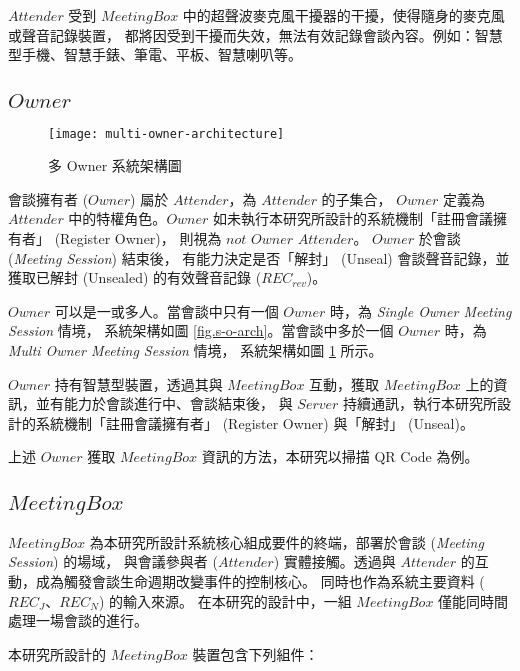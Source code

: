     $Attender$ 受到 $MeetingBox$ 中的超聲波麥克風干擾器的干擾，使得隨身的麥克風或聲音記錄裝置，
都將因受到干擾而失效，無法有效記錄會談內容。例如：智慧型手機、智慧手錶、筆電、平板、智慧喇叭等。


\subsection{$Owner$}

\begin{figure}[H]
    \centering
    \texttt{[image: multi-owner-architecture]}
    \caption{多 Owner 系統架構圖}
    \label{fig.m-o-arch}
\end{figure}

    會談擁有者 ($Owner$) 屬於 $Attender$，為 $Attender$ 的子集合，
$Owner$ 定義為 $Attender$ 中的特權角色。$Owner$ 如未執行本研究所設計的系統機制「註冊會議擁有者」 (Register Owner)，
則視為 $not$ $Owner$ $Attender$。 $Owner$ 於會談 ({\it Meeting Session}) 結束後，
有能力決定是否「解封」 (Unseal) 會談聲音記錄，並獲取已解封 (Unsealed) 的有效聲音記錄 ($REC_{rev}$)。

    $Owner$ 可以是一或多人。當會談中只有一個 $Owner$ 時，為 {\it Single Owner Meeting Session} 情境，
系統架構如圖 \ref{fig.s-o-arch}。當會談中多於一個 $Owner$ 時，為 {\it Multi Owner Meeting Session} 情境，
系統架構如圖 \ref{fig.m-o-arch} 所示。

    $Owner$ 持有智慧型裝置，透過其與 $MeetingBox$ 互動，獲取 $MeetingBox$ 上的資訊，並有能力於會談進行中、會談結束後，
與 $Server$ 持續通訊，執行本研究所設計的系統機制「註冊會議擁有者」 (Register Owner) 與「解封」 (Unseal)。

    上述 $Owner$ 獲取 $MeetingBox$ 資訊的方法，本研究以掃描 QR Code 為例。


\subsection{$MeetingBox$}

    $MeetingBox$ 為本研究所設計系統核心組成要件的終端，部署於會談 ({\it Meeting Session}) 的場域，
與會議參與者 ($Attender$) 實體接觸。透過與 $Attender$ 的互動，成為觸發會談生命週期改變事件的控制核心。
同時也作為系統主要資料 ($REC_{J}$、$REC_{N}$) 的輸入來源。
在本研究的設計中，一組 $MeetingBox$ 僅能同時間處理一場會談的進行。

    本研究所設計的 $MeetingBox$ 裝置包含下列組件：

